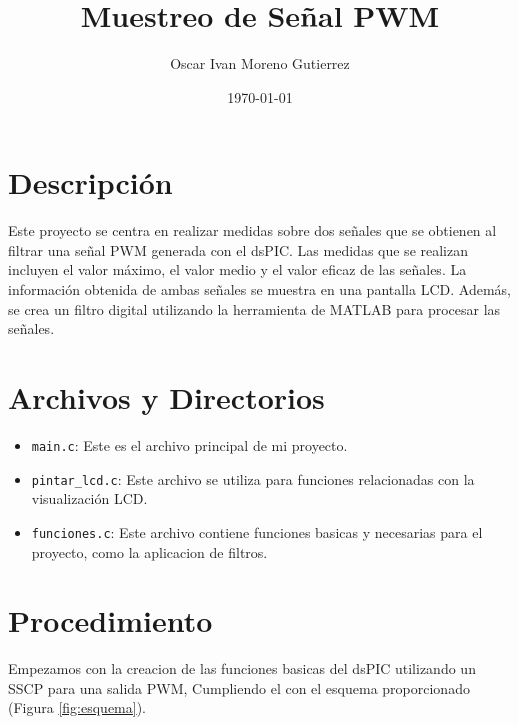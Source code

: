 \documentclass{article}
\title{Muestreo de Señal PWM}
\author{Oscar Ivan Moreno Gutierrez}
\date{\today}
\begin{document}
\maketitle

\section{Descripción}
Este proyecto se centra en realizar medidas sobre dos señales que se obtienen al filtrar una señal PWM generada con el dsPIC. Las medidas que se realizan incluyen el valor máximo, el valor medio y el valor eficaz de las señales. La información obtenida de ambas señales se muestra en una pantalla LCD. Además, se crea un filtro digital utilizando la herramienta de MATLAB para procesar las señales.
\section{Archivos y Directorios}
\begin{itemize}
\item \texttt{main.c}: Este es el archivo principal de mi proyecto.
\item \texttt{pintar\_lcd.c}: Este archivo se utiliza para funciones relacionadas con la visualización LCD.
\item \texttt{funciones.c}: Este archivo contiene funciones basicas y necesarias para el proyecto, como la aplicacion de filtros.
\end{itemize}



\section{Procedimiento}
Empezamos con la creacion de las funciones basicas del dsPIC utilizando un SSCP para una salida PWM, Cumpliendo el con el esquema proporcionado (Figura \ref{fig:esquema}).
\end{document}
